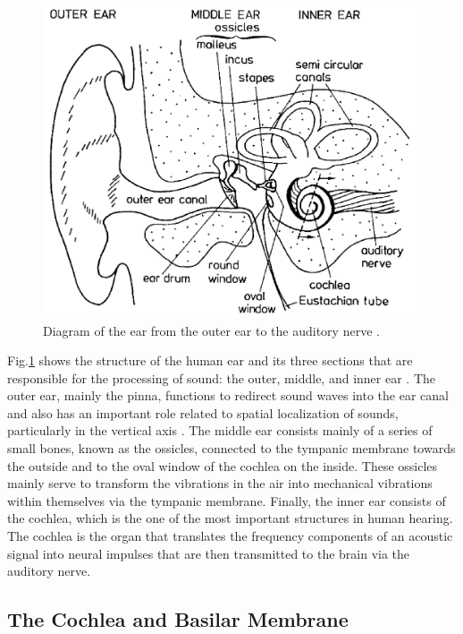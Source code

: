\documentclass[titlepage]{article}
\begin{document}
    \begin{figure}
      \centering
      \includegraphics[scale=0.32]{earDiagram}
      \caption{Diagram of the ear from the outer ear to the auditory nerve \cite{Fastl2007}.}
      \label{earDiagram}
    \end{figure}

    Fig.\ref{earDiagram} shows the structure of the human ear and its three sections that
    are responsible for the processing of sound: the outer, middle, and inner ear \cite{Schnupp2011,Rabiner2007}.
    The outer ear, mainly the pinna, functions to redirect sound waves into the ear canal and
    also has an important role related to spatial localization of sounds, particularly in the vertical axis \cite{Kandel2000}.
    The middle ear consists mainly of a series of small bones, known as the ossicles, connected
    to the tympanic membrane towards the outside and to the oval window of the cochlea on
    the inside. These ossicles mainly serve to transform the vibrations in the air into mechanical
    vibrations within themselves via the tympanic membrane. Finally, the inner ear consists of the
    cochlea, which is the one of the most important structures in human hearing. The cochlea is the
    organ that translates the frequency components of an acoustic signal into neural impulses that
    are then transmitted to the brain via the auditory nerve.

  \subsection{The Cochlea and Basilar Membrane}
\end{document}
